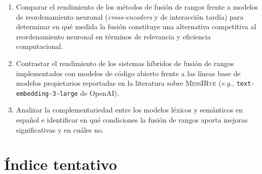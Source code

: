 \documentclass[12pt]{article}
\begin{document}
\begin{itemize}
\begin{enumerate}
           \item Comparar el rendimiento de los métodos de fusión de rangos frente a modelos de reordenamiento neuronal (\textit{cross-encoders} y de interacción tardía) para determinar en qué medida la fusión constituye una alternativa competitiva al reordenamiento neuronal en términos de relevancia y eficiencia computacional.
            
            \item Contrastar el rendimiento de los sistemas híbridos de fusión de rangos implementados con modelos de código abierto frente a las líneas base de modelos propietarios reportadas en la literatura sobre \textsc{MessIRve} (\textit{e.g.}, \texttt{text-embedding-3-large} de OpenAI).
            
            \item Analizar la complementariedad entre los modelos léxicos y semánticos en español e identificar en qué condiciones la fusión de rangos aporta mejoras significativas y en cuáles no.
        \end{enumerate}
        
    \end{itemize}
    
    \section{Índice tentativo}\label{sec:índice}
    
\end{document}
